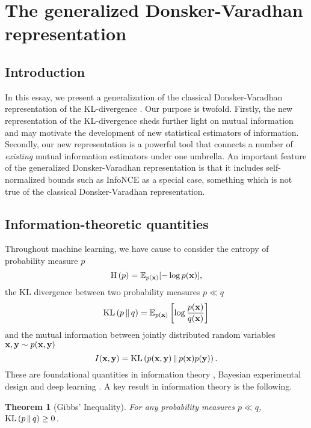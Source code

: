 \documentclass[a4paper, 10pt]{report}
\theoremstyle{plain}
\newtheorem{theorem}{Theorem}[chapter]
\begin{document}
	\clearpage
	\section{The generalized Donsker-Varadhan representation}
	\label{sec:bounds}
	
	\subsection{Introduction}
	In this essay, we present a generalization of the classical Donsker-Varadhan representation of the KL-divergence \citep{donsker1975asymptotic}.
	Our purpose is twofold. 
	Firstly, the new representation of the KL-divergence sheds further light on mutual information and may motivate the development of new statistical estimators of information.
	Secondly, our new representation is a powerful tool that connects a number of \emph{existing} mutual information estimators under one umbrella.
	An important feature of the generalized Donsker-Varadhan representation is that it includes self-normalized bounds such as InfoNCE \citep{oord2018representation} as a special case, something which is not true of the classical Donsker-Varadhan representation.
	
	\subsection{Information-theoretic quantities}
	Throughout machine learning, we have cause to consider the entropy of probability measure $p$
	\begin{equation}
	\textrm{H}\left(p\right) = \mathbb{E}_{p({\mathbf{x}})}[-\log p({\mathbf{x}})],
	\end{equation}
	the KL divergence between two probability measures $p \ll q$
	\begin{equation}
	\mathrm{KL}\left(p\,\|\,q\right) = \mathbb{E}_{p({\mathbf{x}})}\left[\log \frac{p({\mathbf{x}})}{q({\mathbf{x}})} \right]
	\end{equation}
	and the mutual information between jointly distributed random variables ${\mathbf{x}},{\mathbf{y}} \sim p({\mathbf{x}},{\mathbf{y}})$
	\begin{equation}
	I({\mathbf{x}},{\mathbf{y}}) = \mathrm{KL}\left(p({\mathbf{x}},{\mathbf{y}})\,\|\,p({\mathbf{x}})p({\mathbf{y}})\right).
	\end{equation}
	These are foundational quantities in information theory \citep{shannon1948mathematical}, Bayesian experimental design \citep{lindley1956} and deep learning \citep{linsker1988self}.
	A key result in information theory is the following.
	\begin{theorem}[Gibbs' Inequality]
		For any probability measures $p\ll q$, $\mathrm{KL}\left(p\,\|\,q\right)\ge 0$.
	\end{theorem}
	
\end{document}
